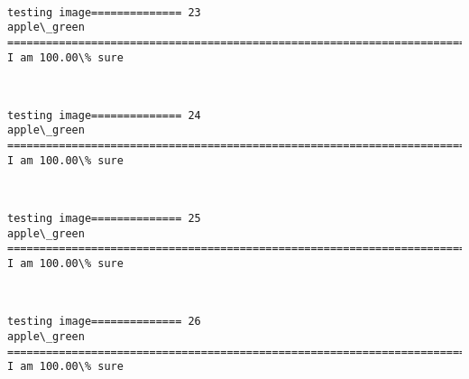 \documentclass[11pt]{article}
\begin{document}
    \begin{center}
    \end{center}
    { \hspace*{\fill} \\}
    
    \begin{Verbatim}[commandchars=\\\{\}]
testing image============== 23
apple\_green
============================================================================
I am 100.00\% sure

    \end{Verbatim}

    \begin{center}
    \end{center}
    { \hspace*{\fill} \\}
    
    \begin{Verbatim}[commandchars=\\\{\}]
testing image============== 24
apple\_green
============================================================================
I am 100.00\% sure

    \end{Verbatim}

    \begin{center}
    \end{center}
    { \hspace*{\fill} \\}
    
    \begin{Verbatim}[commandchars=\\\{\}]
testing image============== 25
apple\_green
============================================================================
I am 100.00\% sure

    \end{Verbatim}

    \begin{center}
    \end{center}
    { \hspace*{\fill} \\}
    
    \begin{Verbatim}[commandchars=\\\{\}]
testing image============== 26
apple\_green
============================================================================
I am 100.00\% sure

    \end{Verbatim}
\end{document}

